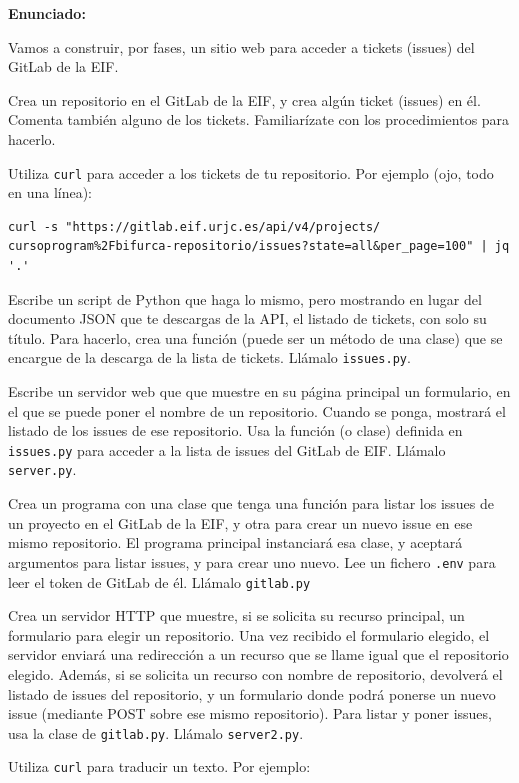 \textbf{Enunciado:}

Vamos a construir, por fases, un sitio web para acceder a tickets (issues) del GitLab de la EIF.

Crea un repositorio en el GitLab de la EIF, y crea algún ticket (issues) en él. Comenta también alguno de los tickets. Familiarízate con los procedimientos para hacerlo.

Utiliza \texttt{curl} para acceder a los tickets de tu repositorio. Por ejemplo (ojo, todo en una línea):

\begin{verbatim}
curl -s "https://gitlab.eif.urjc.es/api/v4/projects/
cursoprogram%2Fbifurca-repositorio/issues?state=all&per_page=100" | jq '.'
\end{verbatim}

Escribe un script de Python que haga lo mismo, pero mostrando en lugar del documento JSON que te descargas de la API, el listado de tickets, con solo su título. Para hacerlo, crea una función (puede ser un método de una clase) que se encargue de la descarga de la lista de tickets. Llámalo \texttt{issues.py}.

Escribe un servidor web que que muestre en su página principal un formulario, en el que se puede poner el nombre de un repositorio. Cuando se ponga, mostrará el listado de los issues de ese repositorio.  Usa la función (o clase) definida en \texttt{issues.py} para acceder a la lista de issues del GitLab de EIF. Llámalo \texttt{server.py}.

Crea un programa con una clase que tenga una función para listar los issues de un proyecto en el GitLab de la EIF, y otra para crear un nuevo issue en ese mismo repositorio. El programa principal instanciará esa clase, y aceptará argumentos para listar issues, y para crear uno nuevo. Lee un fichero \texttt{.env} para leer el token de GitLab de él. Llámalo \texttt{gitlab.py}

Crea un servidor HTTP que muestre, si se solicita su recurso principal, un formulario para elegir un repositorio. Una vez recibido el formulario elegido, el servidor enviará una redirección a un recurso que se llame igual que el repositorio elegido. Además, si se solicita un recurso con nombre de repositorio, devolverá el listado de issues del repositorio, y un formulario donde podrá ponerse un nuevo issue (mediante POST sobre ese mismo repositorio). Para listar y poner issues, usa la clase de \texttt{gitlab.py}. Llámalo \texttt{server2.py}.

Utiliza \texttt{curl} para traducir un texto. Por ejemplo:

